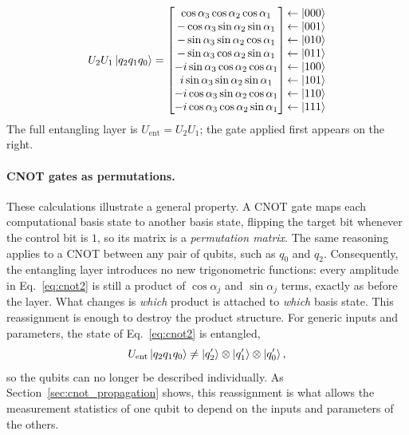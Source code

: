 \documentclass[12pt]{article}
\numberwithin{equation}{section}  %
\begin{document}
\begin{equation}
U_2 U_1 \ket{q_2 q_1 q_0} =
\begin{bmatrix}
\cos\alpha_3 \cos\alpha_2 \cos\alpha_1 \\
-\cos\alpha_3 \sin\alpha_2 \sin\alpha_1 \\
-\sin\alpha_3 \sin\alpha_2 \cos\alpha_1 \\
-\sin\alpha_3 \cos\alpha_2 \sin\alpha_1 \\
-i\sin\alpha_3 \cos\alpha_2 \cos\alpha_1 \\
i\sin\alpha_3 \sin\alpha_2 \sin\alpha_1 \\
-i\cos\alpha_3 \sin\alpha_2 \cos\alpha_1 \\
-i\cos\alpha_3 \cos\alpha_2 \sin\alpha_1
\end{bmatrix}
\begin{matrix} \leftarrow \ket{000} \\ \leftarrow \ket{001} \\ \leftarrow \ket{010} \\ \leftarrow \ket{011} \\ \leftarrow \ket{100} \\ \leftarrow \ket{101} \\ \leftarrow \ket{110} \\ \leftarrow \ket{111} \end{matrix}
\label{eq:cnot2}
\end{equation}
The full entangling layer is $U_{\mathrm{ent}} = U_2 U_1$; the gate applied first appears on the right.

\paragraph{CNOT gates as permutations.} These calculations illustrate a general property. A CNOT gate maps each computational basis state to another basis state, flipping the target bit whenever the control bit is $1$, so its matrix is a \emph{permutation matrix}. The same reasoning applies to a CNOT between any pair of qubits, such as $q_0$ and $q_2$. Consequently, the entangling layer introduces no new trigonometric functions: every amplitude in Eq.~\eqref{eq:cnot2} is still a product of $\cos\alpha_j$ and $\sin\alpha_j$ terms, exactly as before the layer. What changes is \emph{which} product is attached to \emph{which} basis state. This reassignment is enough to destroy the product structure. For generic inputs and parameters, the state of Eq.~\eqref{eq:cnot2} is entangled,
\begin{equation}
U_{\mathrm{ent}} \ket{q_2 q_1 q_0} \neq \ket{q_2'} \otimes \ket{q_1'} \otimes \ket{q_0'},
\end{equation}
so the qubits can no longer be described individually. As Section~\ref{sec:cnot_propagation} shows, this reassignment is what allows the measurement statistics of one qubit to depend on the inputs and parameters of the others.
\end{document}
